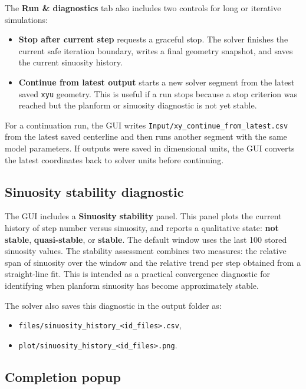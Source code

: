 \documentclass[11pt,a4paper]{article}
\begin{document}
The \textbf{Run \& diagnostics} tab also includes two controls for long or iterative simulations:
\begin{itemize}[leftmargin=1.2em]
    \item \textbf{Stop after current step} requests a graceful stop. The solver finishes the current safe iteration boundary, writes a final geometry snapshot, and saves the current sinuosity history.
    \item \textbf{Continue from latest output} starts a new solver segment from the latest saved \texttt{xyu} geometry. This is useful if a run stops because a stop criterion was reached but the planform or sinuosity diagnostic is not yet stable.
\end{itemize}

For a continuation run, the GUI writes \texttt{Input/xy\_continue\_from\_latest.csv} from the latest saved centerline and then runs another segment with the same model parameters. If outputs were saved in dimensional units, the GUI converts the latest coordinates back to solver units before continuing.

\subsection{Sinuosity stability diagnostic}

The GUI includes a \textbf{Sinuosity stability} panel. This panel plots the current history of step number versus sinuosity, and reports a qualitative state: \textbf{not stable}, \textbf{quasi-stable}, or \textbf{stable}. The default window uses the last 100 stored sinuosity values. The stability assessment combines two measures: the relative span of sinuosity over the window and the relative trend per step obtained from a straight-line fit. This is intended as a practical convergence diagnostic for identifying when planform sinuosity has become approximately stable.

The solver also saves this diagnostic in the output folder as:
\begin{itemize}[leftmargin=1.2em]
	\item \texttt{files/sinuosity\_history\_<id\_files>.csv},
	\item \texttt{plot/sinuosity\_history\_<id\_files>.png}.
\end{itemize}

\subsection{Completion popup}
\end{document}
